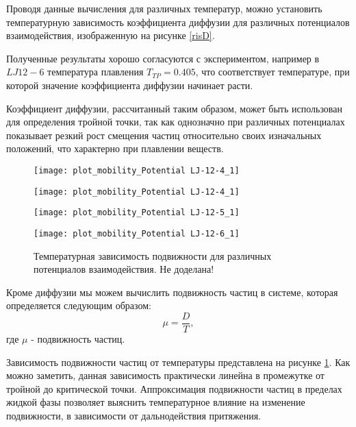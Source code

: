 Проводя данные вычисления для различных температур, можно установить температурную зависимость коэффициента диффузии для различных потенциалов взаимодействия, изображенную на рисунке \ref{risD}.

Полученные результаты хорошо согласуются с экспериментом, например в $LJ12-6$ температура плавления $T_{TP} = 0.405$, что соответствует температуре, при которой значение коэффициента диффузии начинает расти.

Коэффициент диффузии, рассчитанный таким образом, может быть использован для определения тройной точки, так как однозначно при различных потенциалах показывает резкий рост смещения частиц относительно своих изначальных положений, что характерно при плавлении веществ.

\begin{figure}[h]
\begin{center}
\begin{minipage}[h]{0.45\linewidth}
\texttt{[image: plot\_mobility\_Potential LJ-12-4\_1]}
\end{minipage}
\begin{minipage}[h]{0.45\linewidth}
\texttt{[image: plot\_mobility\_Potential LJ-12-4\_1]}
\end{minipage}
\begin{minipage}[h]{0.45\linewidth}
\texttt{[image: plot\_mobility\_Potential LJ-12-5\_1]}
\end{minipage}
\begin{minipage}[h]{0.45\linewidth}
\texttt{[image: plot\_mobility\_Potential LJ-12-6\_1]}
\end{minipage}
\caption{Температурная зависимость подвижности для различных потенциалов взаимодействия. Не доделана!}
\label{risMuDiff}
\end{center}
\end{figure}

Кроме диффузии мы можем вычислить подвижность частиц в системе, которая определяется следующим образом:
\begin{equation}
    \mu  = \frac{D}{T},
    \label{eqMuDiff}
\end{equation}
где $\mu$ - подвижность частиц.

Зависимость подвижности частиц от температуры представлена на рисунке \ref{risMuDiff}.
Как можно заметить, данная зависимость практически линейна в промежутке от тройной до критической точки. Аппроксимация подвижности частиц в пределах жидкой фазы позволяет выяснить температурное влияние на изменение подвижности, в зависимости от дальнодействия притяжения.

